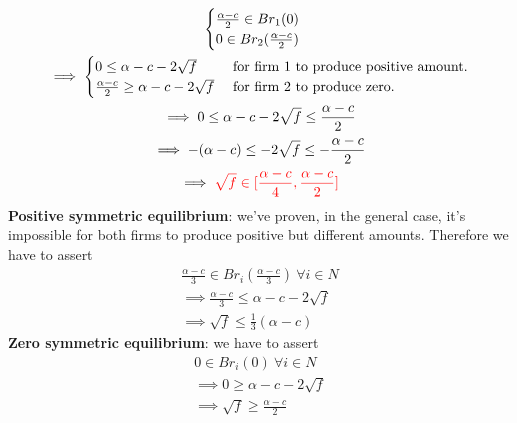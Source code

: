 \documentclass[11pt]{article}
\begin{document}
\begin{example}
\begin{gather}
			\begin{cases}
				\frac{\alpha - c}{2} \in Br_1(0) \\
				0 \in Br_2(\frac{\alpha - c}{2})
			\end{cases} \\
			\implies
			\begin{cases}
				0 \leq \alpha - c - 2\sqrt{f} &\text{{ for firm 1 to produce positive amount.}}\\
				\frac{\alpha - c}{2} \geq \alpha - c - 2\sqrt{f} &\text{{ for firm 2 to produce zero.}}
			\end{cases} \\
			\implies 0 \leq \alpha - c - 2\sqrt{f} \leq \frac{\alpha - c}{2} \\
			\implies -(\alpha - c) \leq - 2\sqrt{f} \leq -\frac{\alpha - c}{2} \\
			\implies \textcolor{red}{\sqrt{f} \in [\frac{\alpha-c}{4}, \frac{\alpha - c}{2}]}
		\end{gather}
		\textbf{Positive symmetric equilibrium}: we've proven, in the general case, it's impossible for both firms to produce positive but different amounts. Therefore we have to assert 
		\begin{gather}
			\frac{\alpha - c}{3} \in Br_i(\frac{\alpha - c}{3})\ \forall i \in N \\
			\implies \frac{\alpha - c}{3} \leq \alpha - c - 2\sqrt{f} \\
			\implies \sqrt{f} \leq \frac{1}{3} (\alpha - c)
		\end{gather}
		\textbf{Zero symmetric equilibrium}: we have to assert
		\begin{gather}
			0 \in Br_i(0)\ \forall i \in N\\
			\implies 0 \geq \alpha - c - 2\sqrt{f} \\
			\implies \sqrt{f} \geq \frac{\alpha - c}{2}
		\end{gather}
	\end{example}
	
\end{document}
